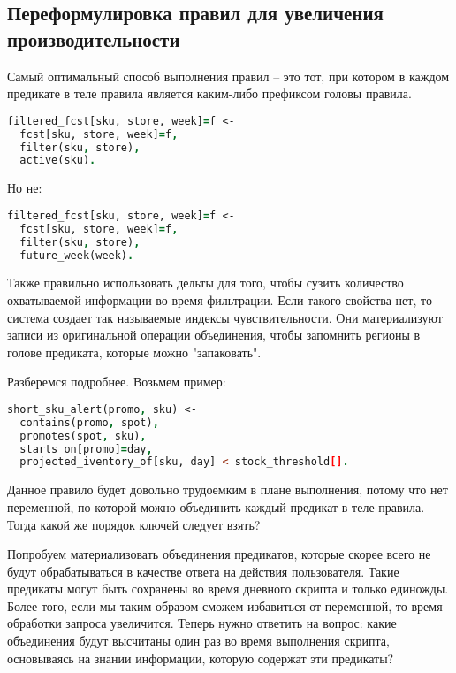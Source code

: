 \subsection{Переформулировка правил для увеличения производительности}
\label{sec:optimization:data_repr:rule_split}

Самый оптимальный способ выполнения правил – это тот, при котором в каждом предикате в теле правила является каким-либо префиксом головы правила.

\begin{lstlisting}[language=Prolog]
filtered_fcst[sku, store, week]=f <-
  fcst[sku, store, week]=f,
  filter(sku, store),
  active(sku).
\end{lstlisting}

Но не:

\begin{lstlisting}[language=Prolog]
filtered_fcst[sku, store, week]=f <-
  fcst[sku, store, week]=f,
  filter(sku, store),
  future_week(week).
\end{lstlisting}

Также правильно использовать дельты для того, чтобы сузить количество охватываемой информации во время фильтрации. Если такого свойства нет, то система создает так называемые индексы чувствительности. Они материализуют записи из оригинальной операции объединения, чтобы запомнить регионы в голове предиката, которые можно "запаковать".

Разберемся подробнее. Возьмем пример:

\begin{lstlisting}[language=Prolog]
short_sku_alert(promo, sku) <-
  contains(promo, spot),
  promotes(spot, sku),
  starts_on[promo]=day,
  projected_iventory_of[sku, day] < stock_threshold[].
\end{lstlisting}

Данное правило будет довольно трудоемким в плане выполнения, потому что нет переменной, по которой можно объединить каждый предикат в теле правила. Тогда какой же порядок ключей следует взять?

Попробуем материализовать объединения предикатов, которые скорее всего не будут обрабатываться в качестве ответа на действия пользователя. Такие предикаты могут быть сохранены во время дневного скрипта и только единожды. Более того, если мы таким образом сможем избавиться от переменной, то время обработки запроса увеличится. Теперь нужно ответить на вопрос: какие объединения будут высчитаны один раз во время выполнения скрипта, основываясь на знании информации, которую содержат эти предикаты?

